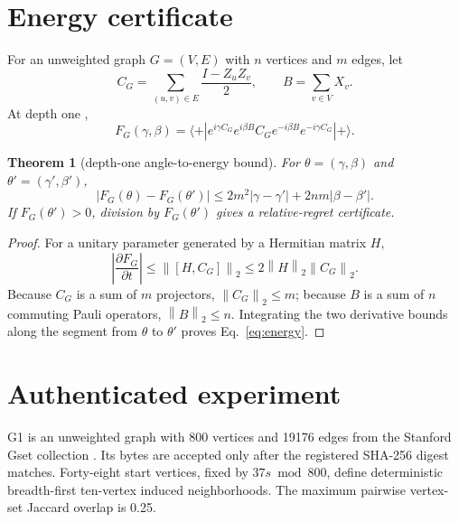 \documentclass[10pt,letterpaper,twoside]{article}
\newtheorem{theorem}{Theorem}
\newcommand{\norm}[1]{\left\lVert #1\right\rVert}
\begin{document}
\section{Energy certificate}

For an unweighted graph $G=(V,E)$ with $n$ vertices and $m$ edges, let
\begin{equation}
 C_G=\sum_{(u,v)\in E}\frac{I-Z_uZ_v}{2},
 \qquad B=\sum_{v\in V}X_v.
\end{equation}
At depth one \cite{farhi2014qaoa},
\begin{equation}
 F_G(\gamma,\beta)=\langle +|e^{i\gamma C_G}e^{i\beta B}
 C_Ge^{-i\beta B}e^{-i\gamma C_G}|+\rangle.
\end{equation}

\begin{theorem}[depth-one angle-to-energy bound]
\label{thm:energy}
For $\theta=(\gamma,\beta)$ and $\theta'=(\gamma',\beta')$,
\begin{equation}
 |F_G(\theta)-F_G(\theta')|
 \le2m^2|\gamma-\gamma'|+2nm|\beta-\beta'|.           \label{eq:energy}
\end{equation}
If $F_G(\theta')>0$, division by $F_G(\theta')$ gives a relative-regret
certificate.
\end{theorem}

\begin{proof}
For a unitary parameter generated by a Hermitian matrix $H$,
\begin{equation}
 \left|\frac{\partial F_G}{\partial t}\right|
 \le\norm{[H,C_G]}_2
 \le2\norm H_2\norm{C_G}_2.
\end{equation}
Because $C_G$ is a sum of $m$ projectors, $\norm{C_G}_2\le m$; because $B$ is
a sum of $n$ commuting Pauli operators, $\norm B_2\le n$.  Integrating the
two derivative bounds along the segment from $\theta$ to $\theta'$ proves
Eq.~\eqref{eq:energy}.
\end{proof}

\section{Authenticated experiment}

G1 is an unweighted graph with 800 vertices and 19176 edges from the Stanford
Gset collection \cite{gset}.  Its bytes are accepted only after the registered
SHA-256 digest matches.  Forty-eight start vertices, fixed by
$37s\bmod800$, define deterministic breadth-first ten-vertex induced
neighborhoods.  The maximum pairwise vertex-set Jaccard overlap is 0.25.
\end{document}
